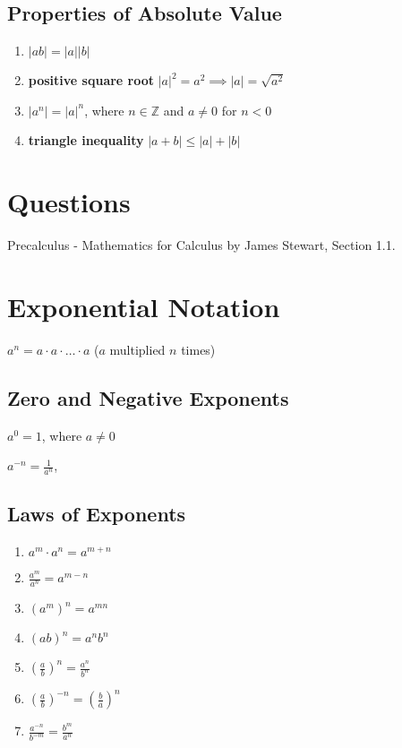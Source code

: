 \subsection{Properties of Absolute Value}
\begin{enumerate}
    \item $|ab| = |a||b|$
    \item \textbf{positive square root} $|a|^2 = a^2 \implies |a| = \sqrt{a^2}$ 
    \item $|a^n| = |a|^n$, where $n \in \mathbb{Z}$ and $a \neq 0$ for $n < 0$
    \item \textbf{triangle inequality} $|a + b| \leq |a| + |b|$
\end{enumerate}

\section{Questions}

Precalculus - Mathematics for Calculus by James Stewart, Section 1.1.

\section{Exponential Notation}
\begin{description}
    \item $a^n = a \cdot a \cdot \ldots \cdot a$ ($a$ multiplied $n$ times)
\end{description}

\subsection{Zero and Negative Exponents}
\begin{description}
    \item $a^0 = 1$, where $a \neq 0$
    \item $a^{-n} = \frac{1}{a^n}$,
\end{description}

\subsection{Laws of Exponents}
\begin{enumerate}
    \item $a^m \cdot a^n = a^{m+n}$
    \item $\frac{a^m}{a^n} = a^{m-n}$
    \item $(a^m)^n = a^{mn}$
    \item $(ab)^n = a^n b^n$
    \item $\left(\frac{a}{b}\right)^n = \frac{a^n}{b^n}$
    \item $\left(\frac{a}{b}\right)^{-n} = \left(\frac{b}{a}\right)^n$
    \item $\frac{a^{-n}}{b^{-m}} = \frac{b^m}{a^n}$
\end{enumerate}

